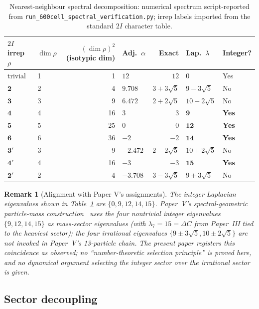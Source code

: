 \documentclass[12pt]{article}
\newtheorem{remark}[theorem]{Remark}
\begin{document}
\begin{table}[ht]
\centering
\caption{Nearest-neighbour spectral decomposition: numerical spectrum script-reported from \texttt{run\_600cell\_spectral\_verification.py}; irrep labels imported from the standard $2I$ character table.}
\label{tab:spectrum}
\begin{tabular}{@{}llrlrll@{}}
\toprule
$2I$ irrep $\rho$ & $\dim \rho$ & $(\dim \rho)^2$ (isotypic dim) & Adj.\ $\alpha$ & Exact & Lap.\ $\lambda$ & Integer? \\
\midrule
trivial & 1 & 1 & $12$ & $12$ & $0$ & Yes \\
$\mathbf{2}$ & 2 & 4 & $9.708$ & $3{+}3\sqrt{5}$ & $9{-}3\sqrt{5}$ & No \\
$\mathbf{3}$ & 3 & 9 & $6.472$ & $2{+}2\sqrt{5}$ & $10{-}2\sqrt{5}$ & No \\
$\mathbf{4}$ & 4 & 16 & $3$ & $3$ & $\mathbf{9}$ & \textbf{Yes} \\
$\mathbf{5}$ & 5 & 25 & $0$ & $0$ & $\mathbf{12}$ & \textbf{Yes} \\
$\mathbf{6}$ & 6 & 36 & $-2$ & $-2$ & $\mathbf{14}$ & \textbf{Yes} \\
$\mathbf{3'}$ & 3 & 9 & $-2.472$ & $2{-}2\sqrt{5}$ & $10{+}2\sqrt{5}$ & No \\
$\mathbf{4'}$ & 4 & 16 & $-3$ & $-3$ & $\mathbf{15}$ & \textbf{Yes} \\
$\mathbf{2'}$ & 2 & 4 & $-3.708$ & $3{-}3\sqrt{5}$ & $9{+}3\sqrt{5}$ & No \\
\bottomrule
\end{tabular}
\end{table}

\begin{remark}[Alignment with Paper V's assignments]\label{rem:integer}
The integer Laplacian eigenvalues shown in Table~\ref{tab:spectrum} are $\{0, 9, 12, 14, 15\}$. Paper~V's spectral-geometric particle-mass construction~\citep{SmartV} uses the four nontrivial integer eigenvalues $\{9, 12, 14, 15\}$ as mass-sector eigenvalues (with $\lambda_7 = 15 = \Delta C$ from Paper~III tied to the heaviest sector); the four irrational eigenvalues $\{9 \pm 3\sqrt{5}, 10 \pm 2\sqrt{5}\}$ are not invoked in Paper~V's 13-particle chain. The present paper registers this coincidence as observed; no ``number-theoretic selection principle'' is proved here, and no dynamical argument selecting the integer sector over the irrational sector is given.
\end{remark}

\subsection{Sector decoupling}
\end{document}
